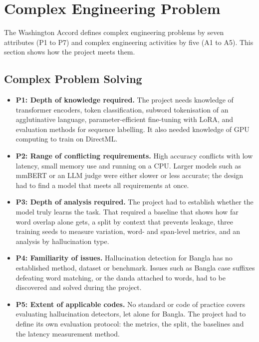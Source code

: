 \section{Complex Engineering Problem}
\label{sec:complex}

The Washington Accord defines complex engineering problems by seven attributes
(P1 to P7) and complex engineering activities by five (A1 to A5). This section
shows how the project meets them.

\subsection{Complex Problem Solving}

\begin{itemize}
  \item \textbf{P1: Depth of knowledge required.} The project needs knowledge of
  transformer encoders, token classification, subword tokenisation of an
  agglutinative language, parameter-efficient fine-tuning with LoRA, and
  evaluation methods for sequence labelling. It also needed knowledge of GPU
  computing to train on DirectML.
  \item \textbf{P2: Range of conflicting requirements.} High accuracy conflicts
  with low latency, small memory use and running on a CPU. Larger models such as
  mmBERT or an LLM judge were either slower or less accurate; the design had to
  find a model that meets all requirements at once.
  \item \textbf{P3: Depth of analysis required.} The project had to establish
  whether the model truly learns the task. That required a baseline that shows
  how far word overlap alone gets, a split by context that prevents leakage,
  three training seeds to measure variation, word- and span-level metrics, and
  an analysis by hallucination type.
  \item \textbf{P4: Familiarity of issues.} Hallucination detection for Bangla
  has no established method, dataset or benchmark. Issues such as Bangla case
  suffixes defeating word matching, or the danda attached to words, had to be
  discovered and solved during the project.
  \item \textbf{P5: Extent of applicable codes.} No standard or code of practice
  covers evaluating hallucination detectors, let alone for Bangla. The project
  had to define its own evaluation protocol: the metrics, the split, the
  baselines and the latency measurement method.

\end{itemize}
